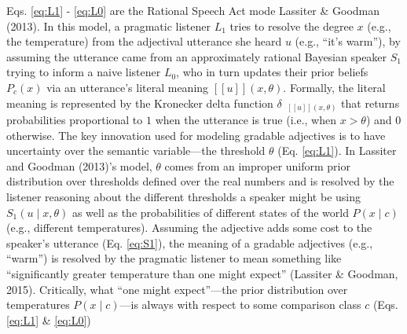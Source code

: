 \documentclass[doc]{apa6}
\begin{document}
Eqs. \ref{eq:L1} - \ref{eq:L0} are the Rational Speech Act mode  Lassiter \& Goodman (2013). 
In this model, a pragmatic listener \(L_1\)
tries to resolve the degree \(x\) (e.g., the temperature)
from the adjectival utterance she heard \(u\) (e.g., ``it's warm''), by assuming the utterance came from an approximately rational Bayesian
speaker \(S_1\) trying to inform a naive listener \(L_0\), who in turn
updates their prior beliefs \(P_c(x)\) via an utterance's literal meaning
\([\![u]\!](x, \theta)\).
Formally, the literal meaning is represented by the
Kronecker delta function \(\delta_{\mbox{ $[\![ u ]\!]$}(x, \theta)}\)
that returns probabilities proportional to \(1\) when the utterance is
true (i.e., when \(x > \theta\)) and \(0\) otherwise.
The key innovation used for modeling gradable adjectives is to have uncertainty over the
semantic variable---the threshold \(\theta\) (Eq. \ref{eq:L1}). In
Lassiter and Goodman (2013)'s model, \(\theta\) comes from an improper uniform
prior distribution over thresholds defined over the real numbers and is resolved by the
listener reasoning about the different thresholds a speaker might be
using \(S_{1}(u \mid x, \theta)\) as well as the probabilities of
different states of the world \(P(x \mid c)\) (e.g., different
temperatures). Assuming the adjective adds some cost to the speaker's
utterance (Eq. \ref{eq:S1}), the meaning of a gradable adjectives (e.g.,
``warm'') is resolved by the pragmatic listener to mean something
like ``significantly greater temperature than one might expect''
(Lassiter \& Goodman, 2015). Critically, what ``one might
expect''---the prior distribution over temperatures \(P(x \mid c)\)---is
always with respect to some comparison class \(c\) (Eqs. \ref{eq:L1} \&
\ref{eq:L0})
\end{document}
